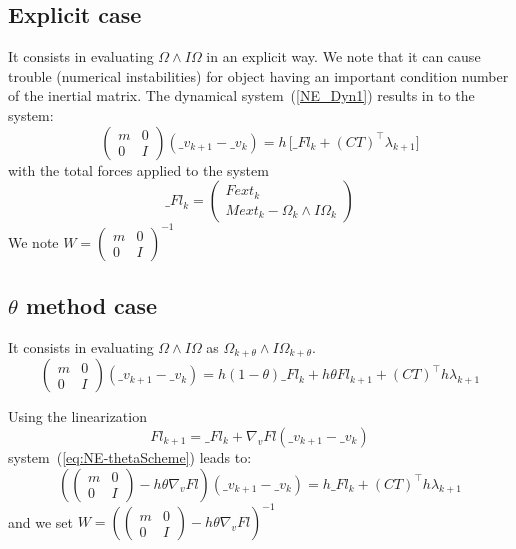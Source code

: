\subsection{Explicit case}
It consists in evaluating $\Omega  \wedge I\Omega $ in an explicit way. We note that it can cause trouble (numerical instabilities) for object having an important condition number of the inertial matrix.
The dynamical system~(\ref{NE_Dyn1}) results in to the system:
\begin{equation}
  \left(\begin{array}{cc} m&0\\0&I\end{array}\right)
   (\_v_{k+1}-\_v_{k})=
   h\, \big[\_Fl_k +
    (CT)^\top \lambda _{k+1}\big]
  \end{equation}
  with the total forces applied to the system \[\_Fl_k = \left(\begin{array}{c} Fext_k\\ Mext_k - \Omega _k \wedge I\Omega _k \end{array}\right)\]
We note $W = \left(\begin{array}{cc} m&0\\0&I\end{array}\right) ^{-1} $

\subsection{$\theta$ method case}
It consists in evaluating $\Omega  \wedge I\Omega $ as $\Omega _{k+\theta}  \wedge I\Omega _{k+\theta} $.
\begin{equation}
  \left(\begin{array}{cc} m&0\\0&I\end{array}\right)
   (\_v_{k+1}-\_v_{k})=
   h (1-\theta)\_Fl_k + h \theta Fl_{k+1} +
   (CT)^\top h\lambda _{k+1}
  \label{eq:NE-thetaScheme} 
 \end{equation}

Using the linearization $$Fl_{k+1} = \_Fl_{k}+\nabla _v Fl (\_v_{k+1}-\_v_{k})$$system~(\ref{eq:NE-thetaScheme}) leads to:
\begin{equation}
  \left(\left(\begin{array}{cc} m&0\\0&I\end{array}\right)-h\theta\nabla _v Fl\right)
   (\_v_{k+1}-\_v_{k})=
   h \_Fl_k + (CT)^\top h\lambda _{k+1}
  \end{equation}
and we set $W =  \left(\left(\begin{array}{cc} m&0\\0&I\end{array}\right)-h\theta\nabla _v Fl\right)^{-1} $



